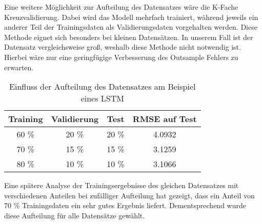 
Eine weitere Möglichkeit zur Aufteilung des Datensatzes wäre die K-Fache Kreuzvalidierung. Dabei wird das Modell mehrfach trainiert, während jeweils ein anderer Teil der Trainingsdaten als Validierungsdaten vorgehalten werden. Diese Methode eignet sich besonders bei kleinen Datensätzen. In unserem Fall ist der Datensatz vergleichsweise groß, weshalb diese Methode nicht notwendig ist. Hierbei wäre nur eine geringfügige Verbesserung des Outsample Fehlers zu erwarten.

\begin{table}[h]
  \centering
  \begin{tabular}{|c|c|c|c|}
    \hline

    \textbf{Training} & \textbf{Validierung} & \textbf{Test} & \textbf{RMSE auf Test} \\ \hline  

    60 \% & 20 \% & 20 \% & 4.0932 \\ \hline
    70 \% & 15 \% & 15 \% & 3.1259 \\ \hline
    80 \% & 10 \% & 10 \% & 3.1066 \\ \hline

  \end{tabular}
  \caption{Einfluss der Aufteilung des Datensatzes am Beispiel eines LSTM}
\end{table}

Eine spätere Analyse der Trainingsergebnisse des gleichen Datensatzes mit verschiedenen Anteilen bei zufälliger Aufteilung hat gezeigt, dass ein Anteil von 70 \% Trainingsdaten ein sehr gutes Ergebnis liefert. Dementsprechend wurde diese Aufteilung für alle Datensätze gewählt.